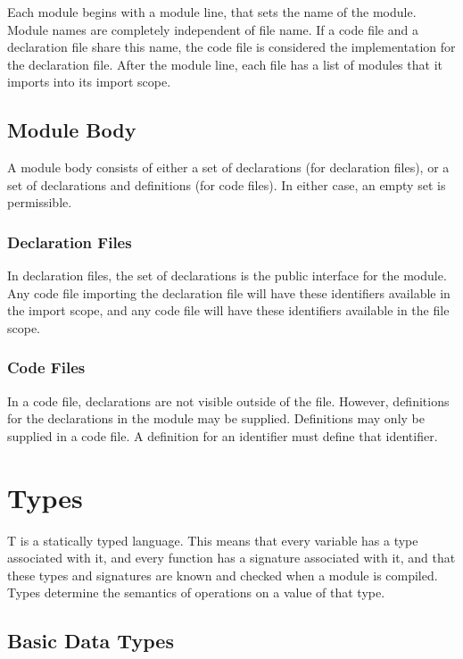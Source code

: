 \documentclass[letterpaper,12pt]{book}
\begin{document}
Each module begins with a module line, that sets the name of the module. Module names are completely independent of file name. If a code file and a declaration file share this name, the code file is considered the implementation for the declaration file. After the module line, each file has a list of modules that it imports into its import scope.

\section{Module Body}

A module body consists of either a set of declarations (for declaration files), or a set of declarations and definitions (for code files). In either case, an empty set is permissible.

\subsection{Declaration Files}

In declaration files, the set of declarations is the public interface for the module. Any code file importing the declaration file will have these identifiers available in the import scope, and any code file will have these identifiers available in the file scope.

\subsection{Code Files}

In a code file, declarations are not visible outside of the file. However, definitions for the declarations in the module may be supplied. Definitions may only be supplied in a code file. A definition for an identifier must define that identifier.

\chapter{Types}

T is a statically typed language. This means that every variable has a type associated with it, and every function has a signature associated with it, and that these types and signatures are known and checked when a module is compiled. Types determine the semantics of operations on a value of that type.

\section{Basic Data Types}
\end{document}
